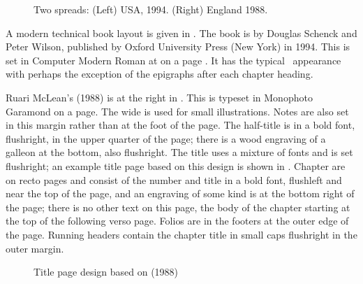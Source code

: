 \documentclass[10pt,letterpaper,extrafontsizes]{memoir}
\begin{document}
\begin{figure}
\centering
\begin{minipage}[b]{\pwlayi}
\end{minipage}
\hfill
\begin{minipage}[b]{\pwlayi}
\end{minipage}
\caption[Two spreads: USA, 1994 and England, 1988]%
        {Two spreads: (Left) USA, 1994.
         (Right) England 1988.} \label{fb:7}
\end{figure}

    A modern technical book layout is given in . The book
is  by Douglas Schenck and Peter
Wilson, published by Oxford University Press (New York) in 1994. This is
set in Computer Modern Roman at  
on a page . 
It has the typical \ltx\ appearance with perhaps the exception of the
epigraphs after each chapter heading.

Ruari McLean's  (1988) is at the right in . This is typeset in  
Monophoto Garamond 
on a  page. The wide
\foredge{} is used for small illustrations. 
Notes are also set in this
margin rather than at the foot of the page.
The half-title 
is in a bold font, flushright, in the 
upper quarter of the page; there is a wood engraving of a galleon at the 
bottom, also flushright. The title uses a mixture of fonts
and is set flushright; an example title page based on this design is shown
in . Chapter are on recto
pages and consist of the number and title in a bold font, flushleft and near
the top of the page, and an engraving of some kind is at the bottom
right of the page; there is no other text on this page, the body of
the chapter starting at the top of the following verso page. 
Folios are in the footers at the outer edge
of the page. Running headers contain the chapter
title in small caps flushright in the outer margin.

\begin{figure}
\centering
\begin{showtitle}
\titleTH
\end{showtitle}
\caption{Title page design based on  (1988)} \label{fig:titleTH}
\end{figure}
\end{document}
